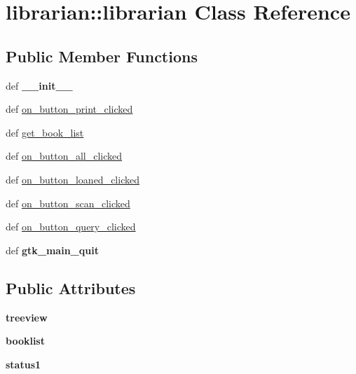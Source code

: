 \hypertarget{classlibrarian_1_1librarian}{
\section{librarian::librarian Class Reference}
\label{classlibrarian_1_1librarian}
}
\subsection*{Public Member Functions}
\begin{DoxyCompactItemize}
\item 
\hypertarget{classlibrarian_1_1librarian_a38767385296af734d843625e880b0f8c}{
def {\bfseries \_\-\_\-init\_\-\_\-}}
\label{classlibrarian_1_1librarian_a38767385296af734d843625e880b0f8c}

\item 
def \hyperlink{classlibrarian_1_1librarian_a8d9587a840f943752194b2c8b61f18a3}{on\_\-button\_\-print\_\-clicked}
\item 
def \hyperlink{classlibrarian_1_1librarian_af1b5a6a4ddf9b300601f1cdc6737ecd4}{get\_\-book\_\-list}
\item 
def \hyperlink{classlibrarian_1_1librarian_a7fb611e38bedeac2295e1ecb2b8aa2cc}{on\_\-button\_\-all\_\-clicked}
\item 
def \hyperlink{classlibrarian_1_1librarian_a7bb690bc8c84830399479b6f47eef8b0}{on\_\-button\_\-loaned\_\-clicked}
\item 
def \hyperlink{classlibrarian_1_1librarian_ad44a8c5d7a8ccb8d2c75e13eccb276b1}{on\_\-button\_\-scan\_\-clicked}
\item 
def \hyperlink{classlibrarian_1_1librarian_af71bf023c78a90863f2505562ad95d95}{on\_\-button\_\-query\_\-clicked}
\item 
\hypertarget{classlibrarian_1_1librarian_aa904a6cfbe8a124965f9e2c148f64227}{
def {\bfseries gtk\_\-main\_\-quit}}
\label{classlibrarian_1_1librarian_aa904a6cfbe8a124965f9e2c148f64227}

\end{DoxyCompactItemize}
\subsection*{Public Attributes}
\begin{DoxyCompactItemize}
\item 
\hypertarget{classlibrarian_1_1librarian_a388a1808d92bbfe00eb3202255a18d67}{
{\bfseries treeview}}
\label{classlibrarian_1_1librarian_a388a1808d92bbfe00eb3202255a18d67}

\item 
\hypertarget{classlibrarian_1_1librarian_a2e4ace15e14d76e6efcc52394c2735d7}{
{\bfseries booklist}}
\label{classlibrarian_1_1librarian_a2e4ace15e14d76e6efcc52394c2735d7}

\item 
\hypertarget{classlibrarian_1_1librarian_a61d3be0b3ed7deafe20920ba3251ad60}{
{\bfseries status1}}
\label{classlibrarian_1_1librarian_a61d3be0b3ed7deafe20920ba3251ad60}

\end{DoxyCompactItemize}


